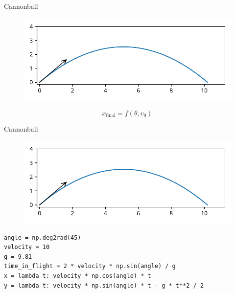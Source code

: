 \documentclass[12pt, aspectratio=149]{beamer}
\theoremstyle{plain}
\begin{document}
\begin{frame}[fragile]{Cannonball}
\vspace*{-1em}
\begin{center}
 \begin{figure}
    	\centering
    	\includegraphics[width=0.99\linewidth]{figures/cannonball}
 \end{figure}
 \end{center}
 \vspace*{-2em}

\begin{center}
\begin{equation*}
x_{\text{final}} = f(\theta, v_0)
\end{equation*}
\end{center}
\end{frame}

\begin{frame}[fragile]{Cannonball}
\vspace*{-1em}
\begin{center}
 \begin{figure}
    	\centering
    	\includegraphics[width=0.99\linewidth]{figures/cannonball}
 \end{figure}
 \end{center}
 \vspace*{-2em}

\begin{center}
\begin{verbatim} 
angle = np.deg2rad(45)
velocity = 10
g = 9.81
time_in_flight = 2 * velocity * np.sin(angle) / g
x = lambda t: velocity * np.cos(angle) * t
y = lambda t: velocity * np.sin(angle) * t - g * t**2 / 2
\end{verbatim}
\end{center}
\end{frame}
\end{document}
